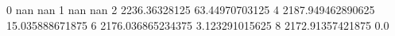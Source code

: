 0 nan nan
1 nan nan
2 2236.36328125 63.44970703125
4 2187.949462890625 15.035888671875
6 2176.036865234375 3.123291015625
8 2172.91357421875 0.0
